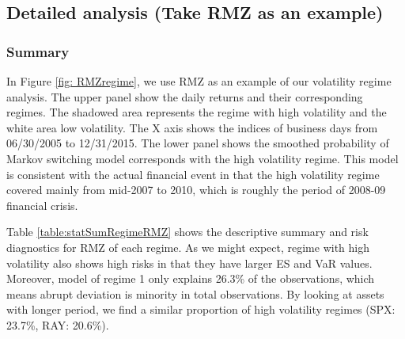 \documentclass[12pt]{article}
\begin{document}
\subsection{Detailed analysis (Take RMZ as an example)}

\subsubsection{Summary}

In Figure \ref{fig: RMZregime}, we use RMZ as an example of our volatility regime analysis. The upper panel show the daily returns and their corresponding regimes. The shadowed area represents the regime with high volatility and the white area low volatility. The X axis shows the indices of business days from 06/30/2005 to 12/31/2015. The lower panel shows the smoothed probability of Markov switching model corresponds with the high volatility regime. This model is consistent with the actual financial event in that the high volatility regime covered mainly from mid-2007 to 2010, which is roughly the period of 2008-09 financial crisis.

Table \ref{table:statSumRegimeRMZ} shows the descriptive summary and risk diagnostics for RMZ of each regime. As we might expect, regime with high volatility also shows high risks in that they have larger ES and VaR values. Moreover, model of regime 1 only explains 26.3\% of the observations, which means abrupt deviation is minority in total observations. By looking at assets with longer period, we find a similar proportion of high volatility regimes (SPX: 23.7\%, RAY: 20.6\%).

\end{document}
